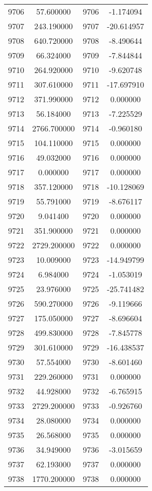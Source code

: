 \documentclass[12pt]{article}
\begin{document}
\begin{longtable}{@{}cccc@{}}
9706 & 57.600000 & 9706 & -1.174094 \\
9707 & 243.190000 & 9707 & -20.614957 \\
9708 & 640.720000 & 9708 & -8.490644 \\
9709 & 66.324000 & 9709 & -7.844844 \\
9710 & 264.920000 & 9710 & -9.620748 \\
9711 & 307.610000 & 9711 & -17.697910 \\
9712 & 371.990000 & 9712 & 0.000000 \\
9713 & 56.184000 & 9713 & -7.225529 \\
9714 & 2766.700000 & 9714 & -0.960180 \\
9715 & 104.110000 & 9715 & 0.000000 \\
9716 & 49.032000 & 9716 & 0.000000 \\
9717 & 0.000000 & 9717 & 0.000000 \\
9718 & 357.120000 & 9718 & -10.128069 \\
9719 & 55.791000 & 9719 & -8.676117 \\
9720 & 9.041400 & 9720 & 0.000000 \\
9721 & 351.900000 & 9721 & 0.000000 \\
9722 & 2729.200000 & 9722 & 0.000000 \\
9723 & 10.009000 & 9723 & -14.949799 \\
9724 & 6.984000 & 9724 & -1.053019 \\
9725 & 23.976000 & 9725 & -25.741482 \\
9726 & 590.270000 & 9726 & -9.119666 \\
9727 & 175.050000 & 9727 & -8.696604 \\
9728 & 499.830000 & 9728 & -7.845778 \\
9729 & 301.610000 & 9729 & -16.438537 \\
9730 & 57.554000 & 9730 & -8.601460 \\
9731 & 229.260000 & 9731 & 0.000000 \\
9732 & 44.928000 & 9732 & -6.765915 \\
9733 & 2729.200000 & 9733 & -0.926760 \\
9734 & 28.080000 & 9734 & 0.000000 \\
9735 & 26.568000 & 9735 & 0.000000 \\
9736 & 34.949000 & 9736 & -3.015659 \\
9737 & 62.193000 & 9737 & 0.000000 \\
9738 & 1770.200000 & 9738 & 0.000000 \\

\end{longtable}
\end{document}
